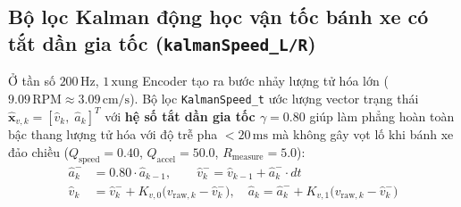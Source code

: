 \documentclass[10pt,a4paper,twocolumn]{article}
\begin{document}
\subsection{Bộ lọc Kalman động học vận tốc bánh xe có tắt dần gia tốc (\texttt{kalmanSpeed\_L/R})}
Ở tần số $200\,\text{Hz}$, $1\,\text{xung}$ Encoder tạo ra bước nhảy lượng tử hóa lớn ($9.09\,\text{RPM} \approx 3.09\,\text{cm/s}$). Bộ lọc \texttt{KalmanSpeed\_t} ước lượng vector trạng thái $\hat{\mathbf{x}}_{v,k} = [\hat{v}_k,\; \hat{a}_k]^T$ với \textbf{hệ số tắt dần gia tốc $\gamma = 0.80$} giúp làm phẳng hoàn toàn bậc thang lượng tử hóa với độ trễ pha $< 20\,\text{ms}$ mà không gây vọt lố khi bánh xe đảo chiều ($Q_{\text{speed}} = 0.40$, $Q_{\text{accel}} = 50.0$, $R_{\text{measure}} = 5.0$):
\begin{align}
    \hat{a}_k^- &= 0.80 \cdot \hat{a}_{k-1}, \qquad \hat{v}_k^- = \hat{v}_{k-1} + \hat{a}_k^- \cdot dt \\
    \hat{v}_k &= \hat{v}_k^- + K_{v,0}\big(v_{\text{raw},k} - \hat{v}_k^-\big), \quad \hat{a}_k = \hat{a}_k^- + K_{v,1}\big(v_{\text{raw},k} - \hat{v}_k^-\big)
\end{align}
\end{document}
